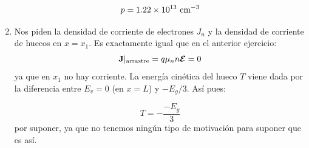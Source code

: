 \begin{texercise}
\begin{enumerate}[label=\alph*)]
		\begin{equation}
			p = 1.22 \times 10^{13} \ \text{cm}^{-3}
		\end{equation}
		\item Nos piden la densidad de corriente de electrones $J_n$ y la densidad de corriente de huecos en $x=x_1$. Es exactamente igual que en el anterior ejercicio:
		\begin{equation}
			\mathbf{J}|_{\text{{arrastre}}} = q \mu_n n \boldsymbol{\mathcal{E}} = 0
		\end{equation}
		ya que en $x_1$ no hay corriente. La energía cinética del hueco $T$ viene dada por la diferencia entre $E_v=0$ (en $x=L$) y $-E_g/3$. Así pues:

		\begin{equation}
			T = - \frac{-E_g}{3}
		\end{equation}
		por suponer, ya que no tenemos ningún tipo de motivación para suponer que es así. 

	\end{enumerate}
\end{texercise}


\tcbstoprecording


\tcbinputrecords

















